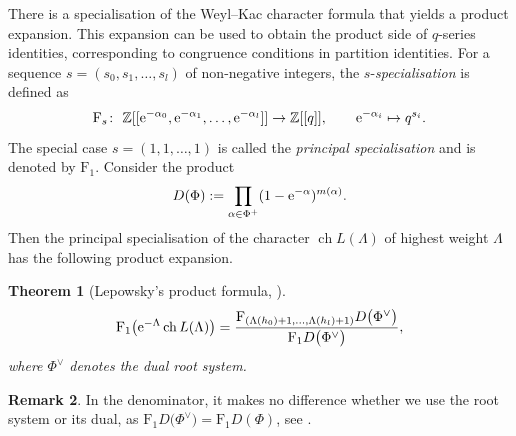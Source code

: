 \documentclass[10pt,a4paper]{amsart}
\numberwithin{equation}{section}
\newtheorem{Theorem}{Theorem}[section]
\theoremstyle{definition}
\newtheorem{Remark}[Theorem]{Remark}
\newcommand{\Z}{\mathbb{Z}}
\begin{document}
There is a specialisation of the Weyl--Kac character formula that yields a product expansion. This expansion can be used to obtain the product side of $q$-series identities, corresponding to congruence conditions in partition identities. For a sequence $s = (s_0,s_1,\ldots,s_l)$ of non-negative integers, the $s$-\emph{specialisation} is defined as
\[
\mathrm{F}_s\colon \ \Z[[{\rm e}^{-\alpha_0},{\rm e}^{-\alpha_1},\ldots,{\rm e}^{-\alpha_l}]]\to \Z[[q]],\qquad {\rm e}^{-\alpha_i}\mapsto q^{s_i}.
\]
The special case $s=(1,1,\ldots,1)$ is called the \emph{principal specialisation} and is denoted by $\mathrm{F}_1$. Consider the product
\[
D(\Phi):=\prod_{\alpha\in\Phi^+} (1-{\rm e}^{-\alpha} )^{m(\alpha)}.
\]
Then the principal specialisation of the character $\operatorname{ch}L(\Lambda)$ of highest weight $\Lambda$ has the following product expansion.

\begin{Theorem}[Lepowsky's product formula, \cite{Lep78}]%
\begin{align*}
 \mathrm{F}_1\bigl({\rm e}^{-\Lambda}\operatorname{ch}L(\Lambda)\bigr) = \frac{\mathrm{F}_{(\Lambda(h_0)+1,\ldots,\Lambda(h_l)+1)} D\bigl(\Phi^\vee\bigr)}{\mathrm{F}_1 D\bigl(\Phi^\vee\bigr)},
\end{align*}
where $\Phi^\vee$ denotes the dual root system.
\end{Theorem}
\begin{Remark}
In the denominator, it makes no difference whether we use the root system or its dual, as $\mathrm{F}_1 D\bigl(\Phi^\vee\bigr) = \mathrm{F}_1 D(\Phi)$, see \cite[equation~(10.8.5)]{Kac90}.
\end{Remark}
\end{document}
